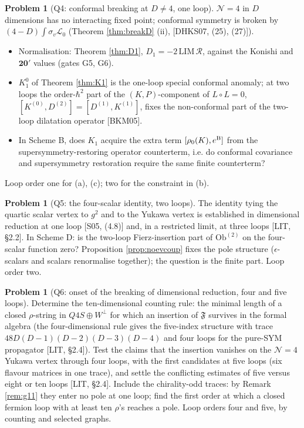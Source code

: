 \documentclass[11pt]{article}
\theoremstyle{definition}
\newtheorem{problem}[definition]{Problem}
\numberwithin{equation}{section}
\begin{document}
\begin{problem}[Q4: conformal breaking at $D\neq4$, one loop]
\label{q:Q4}
$\mathcal N=4$ in $D$ dimensions has no interacting fixed point; conformal symmetry is broken by $(4-D)\int\sigma_v\mathscr L_0$ (Theorem \ref{thm:breakD} (ii), [DHKS07, (25), (27)]).
\begin{itemize}
\item[(a)] Normalisation: Theorem \ref{thm:D1}, $D_1=-2\,\mathrm{LIM}\,\mathcal R$, against the Konishi and $\mathbf{20}'$ values (gates G5, G6).
\item[(b)] $K_1^0$ of Theorem \ref{thm:K1} is the one-loop special conformal anomaly; at two loops the order-$\hbar^2$ part of the $(K,P)$-component of $L\circ L=0$, $[K^{(0)},D^{(2)}]=[D^{(1)},K^{(1)}]$, fixes the non-conformal part of the two-loop dilatation operator [BKM05].
\item[(c)] In Scheme B, does $K_1$ acquire the extra term $[\rho_0(K),e^{\rm B}]$ from the supersymmetry-restoring operator counterterm, i.e. do conformal covariance and supersymmetry restoration require the same finite counterterm?
\end{itemize}
Loop order one for (a), (c); two for the constraint in (b).
\end{problem}

\begin{problem}[Q5: the four-scalar identity, two loops]
\label{q:Q5}
The identity tying the quartic scalar vertex to $g^2$ and to the Yukawa vertex is established in dimensional reduction at one loop [S05, (4.8)] and, in a restricted limit, at three loops [LIT, §2.2]. In Scheme D: is the two-loop Fierz-insertion part of $\mathrm{Ob}^{(2)}$ on the four-scalar function zero? Proposition \ref{prop:noevcoup} fixes the pole structure ($\epsilon$-scalars and scalars renormalise together); the question is the finite part. Loop order two.
\end{problem}

\begin{problem}[Q6: onset of the breaking of dimensional reduction, four and five loops]
\label{q:Q6}
Determine the ten-dimensional counting rule: the minimal length of a closed $\rho$-string in $Q4S\oplus W^\perp$ for which an insertion of $\mathfrak F$ survives in the formal algebra (the four-dimensional rule gives the five-index structure with trace $48D(D-1)(D-2)(D-3)(D-4)$ and four loops for the pure-SYM propagator [LIT, §2.4]). Test the claims that the insertion vanishes on the $\mathcal N=4$ Yukawa vertex through four loops, with the first candidates at five loops (six flavour matrices in one trace), and settle the conflicting estimates of five versus eight or ten loops [LIT, §2.4]. Include the chirality-odd traces: by Remark \ref{rem:g11} they enter no pole at one loop; find the first order at which a closed fermion loop with at least ten $\rho$'s reaches a pole. Loop orders four and five, by counting and selected graphs.
\end{problem}
\end{document}
